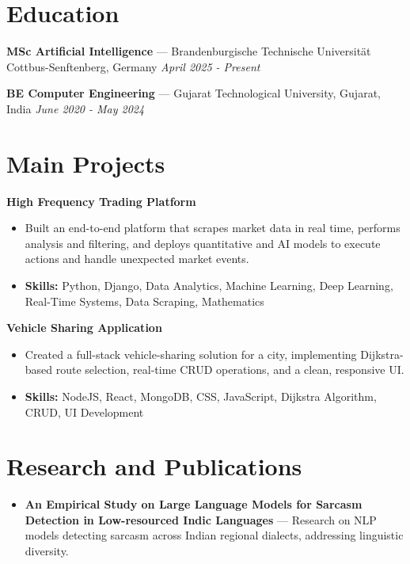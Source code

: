 \documentclass[a4paper,10pt]{article}
\begin{document}
\section*{Education}
\textbf{MSc Artificial Intelligence} — Brandenburgische Technische Universität Cottbus-Senftenberg, Germany \hfill \textit{April 2025 - Present}\par
\vspace{1.5pt}
\textbf{BE Computer Engineering} — Gujarat Technological University, Gujarat, India \hfill \textit{June 2020 - May 2024}\par

\section*{Main Projects}
\textbf{High Frequency Trading Platform}\par
\vspace{1pt}
\begin{itemize}
  \item Built an end-to-end platform that scrapes market data in real time, performs analysis and filtering, and deploys quantitative and AI models to execute actions and handle unexpected market events.
  \item \textbf{Skills:} Python, Django, Data Analytics, Machine Learning, Deep Learning, Real-Time Systems, Data Scraping, Mathematics
\end{itemize}
\vspace{3pt}
\textbf{Vehicle Sharing Application}\par
\vspace{1pt}
\begin{itemize}
  \item Created a full-stack vehicle-sharing solution for a city, implementing Dijkstra-based route selection, real-time CRUD operations, and a clean, responsive UI.
  \item \textbf{Skills:} NodeJS, React, MongoDB, CSS, JavaScript, Dijkstra Algorithm, CRUD, UI Development
\end{itemize}

\section*{Research and Publications}
\begin{itemize}
\item \textbf{An Empirical Study on Large Language Models for Sarcasm Detection in Low-resourced Indic Languages} — Research on NLP models detecting sarcasm across Indian regional dialects, addressing linguistic diversity.
\end{itemize}
\end{document}
